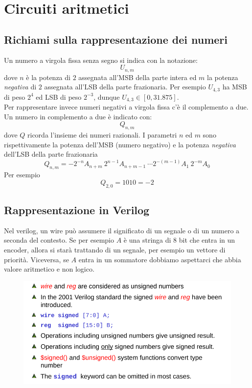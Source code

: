 \documentclass{book}
\begin{document}
\chapter{Circuiti aritmetici}
    \section{Richiami sulla rappresentazione dei numeri}
        Un numero a virgola fissa senza segno si indica con la notazione:
        \begin{equation}
            U_{n,m}
        \end{equation}
        dove $n$ è la potenza di $2$ assegnata all'MSB della parte intera ed $m$ la potenza \textit{negativa} di $2$ assegnata all'LSB della parte frazionaria. Per esempio $U_{4,3}$ ha MSB di peso $2^{4}$ ed LSB di peso $2^{-3}$, dunque $U_{4,3} \in [0, 31.875]$. \\
        Per rappresentare invece numeri negativi a virgola fissa c'è il complemento a due. Un numero in complemento a due è indicato con:
        \begin{equation}
            Q_{n,m}
        \end{equation}
        dove $Q$ ricorda l'insieme dei numeri razionali. I parametri $n$ ed $m$ sono rispettivamente la potenza dell'MSB (numero negativo) e la potenza \textit{negativa} dell'LSB della parte frazionaria
        \begin{equation}
            Q_{n,m} = -2^{-n}A_{n+m} \ 2^{n-1}A_{n+m-1} \ \cdots 2^{-(m-1)}A_{1} \ 2^{-m}A_{0} 
        \end{equation}
        Per esempio
        \begin{equation}
            Q_{2, 0} = 1010 = -2
        \end{equation}
    \section{Rappresentazione in Verilog}
        Nel verilog, un wire può assumere il significato di un segnale o di un numero a seconda del contesto. Se per esempio $A$ è una stringa di $8$ bit che entra in un encoder, allora si starà trattando di un segnale, per esempio un vettore di priorità. Viceversa, se $A$ entra in un sommatore dobbiamo aspettarci che abbia valore aritmetico e non logico.
        \begin{figure}[h!]
            \centering
            \includegraphics[width=0.75\linewidth]{img/chapt10img1.png}
        \end{figure} \\
\end{document}
